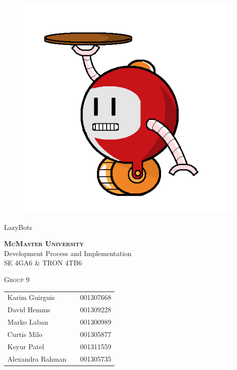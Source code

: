 \documentclass [10pt]{article}
\begin{document}
\begin {center} 

\thispagestyle{empty}
\vspace*{5cm}

\begin {figure}[h!]
\centering
\hspace{-10mm}\includegraphics [scale = .3, trim={.4cm 0 .8cm 0},clip] {figures/alfred.png}
\end {figure}

{\fontfamily{\cabinfamily}\selectfont
\Huge{LazyBots} }

\vspace{1 cm}
{\Large\textbf{\textsc{McMaster University}}\\}  \vspace {1cm}
{\Large Development Process and Implementation\\ \vspace {0.4 cm} SE 4GA6 \& TRON 4TB6}  \vspace {1cm}

{\large \textsc{Group 9} \\} \vspace{1cm}



\begin{tabular}{ l c  l}
Karim Guirguis & & 001307668 \\
David Hemms & & 001309228 \\
Marko Laban & & 001300989 \\
Curtis Milo & & 001305877 \\
Keyur Patel & & 001311559 \\
Alexandra Rahman & & 001305735
\end{tabular}

\end{center}
\end{document}
